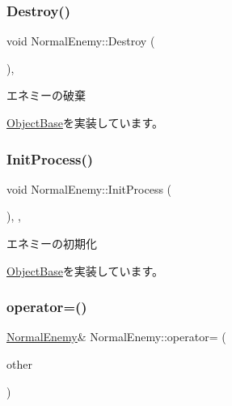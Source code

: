 \mbox{\label{class_normal_enemy_a8a4271b6da6c7679d134d1c08125815b}} 
\subsubsection{\texorpdfstring{Destroy()}{Destroy()}}
{\footnotesize\ttfamily void Normal\+Enemy\+::\+Destroy (\begin{DoxyParamCaption}{ }\end{DoxyParamCaption})\hspace{0.3cm}{\ttfamily [final]}, {\ttfamily [virtual]}}



エネミーの破棄 



\mbox{\hyperlink{class_object_base_a7fa4c548153c3af20f89673ffea809af}{Object\+Base}}を実装しています。

\mbox{\label{class_normal_enemy_ae45bd9535595f810d065b92f8dd63342}} 
\subsubsection{\texorpdfstring{Init\+Process()}{InitProcess()}}
{\footnotesize\ttfamily void Normal\+Enemy\+::\+Init\+Process (\begin{DoxyParamCaption}{ }\end{DoxyParamCaption})\hspace{0.3cm}{\ttfamily [final]}, {\ttfamily [protected]}, {\ttfamily [virtual]}}



エネミーの初期化 



\mbox{\hyperlink{class_object_base_af133f36f2bca1dcfd962e2cfac61ab51}{Object\+Base}}を実装しています。

\mbox{\label{class_normal_enemy_a4294020d85d9ae77a47294e04fd048b6}} 
\subsubsection{\texorpdfstring{operator=()}{operator=()}}
{\footnotesize\ttfamily \mbox{\hyperlink{class_normal_enemy}{Normal\+Enemy}}\& Normal\+Enemy\+::operator= (\begin{DoxyParamCaption}\item[{const \mbox{\hyperlink{class_normal_enemy}{Normal\+Enemy}} \&}]{other }\end{DoxyParamCaption})\hspace{0.3cm}{\ttfamily [inline]}}



